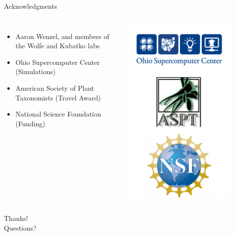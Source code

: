 \documentclass[presentation]{beamer}
\begin{document}
\begin{frame}[t,plain]{Acknowledgments}
	\begin{columns}[onlytextwidth]
	\begin{itemize}
		\item Aaron Wenzel, and members of the Wolfe and Kubatko labs
		\item Ohio Supercomputer Center (Simulations)
		\item American Society of Plant Taxonomists (Travel Award)
		\item National Science Foundation (Funding)
	\end{itemize}
	
	\begin{center}
	\includegraphics[width=0.85\textwidth]{fig/logos}
	\end{center}
	\end{columns}
\end{frame}

\begin{frame}[c,plain]{}
	\begin{center}
		{\Huge Thanks!}\\
		\vspace{0.5in}
		{\LARGE Questions?}
	\end{center}
\end{frame}
\end{document}
